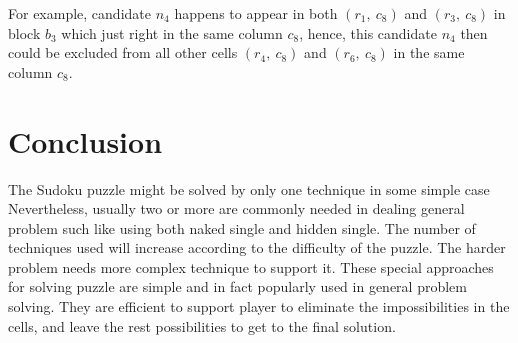 \documentclass[11pt]{report}
\begin{document}
For example, candidate $n_{4}$ happens to appear in both $(r_{1},\ c_{8})$ and $(r_{3},\ c_{8})$ in block $b_{3}$ which just right in the same column $c_{8}$, hence, this candidate $n_{4}$ then could be excluded from all other cells $(r_{4},\ c_{8})$ and $(r_{6},\ c_{8})$ in the same column $c_{8}$.


\chapter{Conclusion}
\label{sec:Conclusion}
The Sudoku puzzle might be solved by only one technique in some simple case Nevertheless, usually two or more are commonly needed in dealing general problem such like using both naked single and hidden single. The number of techniques used will increase according to the difficulty of the puzzle. The harder problem needs more complex technique to support it.
These special approaches for solving puzzle are simple and in fact popularly used in general problem solving. They are efficient to support player to eliminate the impossibilities in the cells, and leave the rest possibilities to get to the final solution.





\end{document}
